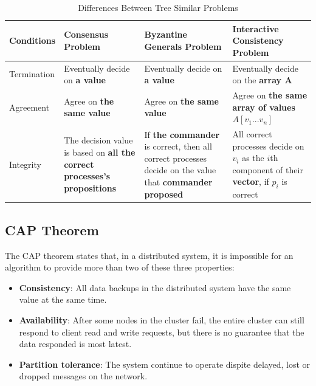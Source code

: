 \documentclass[12pt, a4paper]{article}
\begin{document}
\begin{table}[htp]
  \centering
  \begin{tabular}{|l|p{3.5cm}|p{3.5cm}|p{3.5cm}|}
  \hline
  Conditions & Consensus Problem & Byzantine Generals Problem
    & Interactive Consistency Problem \\
  \hline
  Termination & Eventually decide on \textbf{a value}
    & Eventually decide on \textbf{a value}
    & Eventually decide on the \textbf{array A} \\
  \hline
  Agreement & Agree on \textbf{the same value}
    & Agree on \textbf{the same value}
    & Agree on \textbf{the same array of values $A[v_{1}...v_{n}]$} \\
  \hline
  Integrity
    & The decision value is based on
      \textbf{all the correct processes's propositions}
    & If \textbf{the commander} is correct, then all correct processes decide
      on the value that \textbf{commander proposed}
    & All correct processes decide on $v_{i}$ as the ${i}$th component of their
      \textbf{vector}, if $p_{i}$ is correct \\ \hline
  \end{tabular}
  \caption{Differences Between Tree Similar Problems}
  \label{tab:dbtap}
\end{table}

\subsection{CAP Theorem}

The CAP theorem \cite{brewer2012cap} states that, in a distributed system, it is
impossible for an algorithm to provide more than two of these three properties:

\begin{itemize}
	\item \textbf{Consistency}: All data backups in the distributed system have
    the same value at the same time.
	\item \textbf{Availability}: After some nodes in the cluster fail, the entire
    cluster can still respond to client read and write requests, but there is no
    guarantee that the data responded is most latest.
	\item \textbf{Partition tolerance}: The system continue to operate dispite
    delayed, lost or dropped messages on the network.
\end{itemize}

\end{document}
